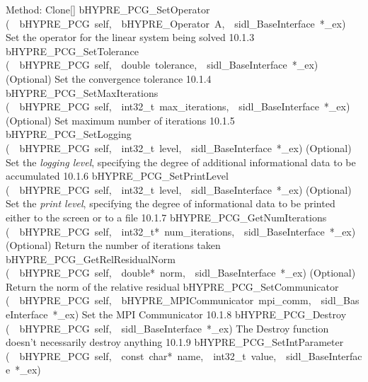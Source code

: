 \documentclass{article}
\begin{document}
\begin{cxxentry}
\begin{cxxentry}
\begin{cxxnames}
        {
Method:  Clone[]}
        {}
\label{cxx.10.1.17}
        {bHYPRE\_PCG\_SetOperator}
        {(\ \ bHYPRE\_PCG\ self,\ \ bHYPRE\_Operator\ A,\ \ sidl\_BaseInterface\ *\_ex)}
        {
Set the operator for the linear system being solved}
        {10.1.3}
        {bHYPRE\_PCG\_SetTolerance}
        {(\ \ bHYPRE\_PCG\ self,\ \ double\ tolerance,\ \ sidl\_BaseInterface\ *\_ex)}
        {
(Optional) Set the convergence tolerance}
        {10.1.4}
        {bHYPRE\_PCG\_SetMaxIterations}
        {(\ \ bHYPRE\_PCG\ self,\ \ int32\_t\ max\_iterations,\ \ sidl\_BaseInterface\ *\_ex)}
        {
(Optional) Set maximum number of iterations}
        {10.1.5}
        {bHYPRE\_PCG\_SetLogging}
        {(\ \ bHYPRE\_PCG\ self,\ \ int32\_t\ level,\ \ sidl\_BaseInterface\ *\_ex)}
        {
(Optional) Set the {\it logging level}, specifying the degree
of additional informational data to be accumulated}
        {10.1.6}
        {bHYPRE\_PCG\_SetPrintLevel}
        {(\ \ bHYPRE\_PCG\ self,\ \ int32\_t\ level,\ \ sidl\_BaseInterface\ *\_ex)}
        {
(Optional) Set the {\it print level}, specifying the degree
of informational data to be printed either to the screen or
to a file}
        {10.1.7}
        {bHYPRE\_PCG\_GetNumIterations}
        {(\ \ bHYPRE\_PCG\ self,\ \ int32\_t*\ num\_iterations,\ \ sidl\_BaseInterface\ *\_ex)}
        {
(Optional) Return the number of iterations taken}
        {}
\label{cxx.10.1.18}
        {bHYPRE\_PCG\_GetRelResidualNorm}
        {(\ \ bHYPRE\_PCG\ self,\ \ double*\ norm,\ \ sidl\_BaseInterface\ *\_ex)}
        {
(Optional) Return the norm of the relative residual}
        {}
\label{cxx.10.1.19}
        {bHYPRE\_PCG\_SetCommunicator}
        {(\ \ bHYPRE\_PCG\ self,\ \ bHYPRE\_MPICommunicator\ mpi\_comm,\ \ sidl\_BaseInterface\ *\_ex)}
        {
Set the MPI Communicator}
        {10.1.8}
        {bHYPRE\_PCG\_Destroy}
        {(\ \ bHYPRE\_PCG\ self,\ \ sidl\_BaseInterface\ *\_ex)}
        {
The Destroy function doesn't necessarily destroy anything}
        {10.1.9}
        {bHYPRE\_PCG\_SetIntParameter}
        {(\ \ bHYPRE\_PCG\ self,\ \ const\ char*\ name,\ \ int32\_t\ value,\ \ sidl\_BaseInterface\ *\_ex)}

\end{cxxnames}
\end{cxxentry}
\end{cxxentry}
\end{document}
